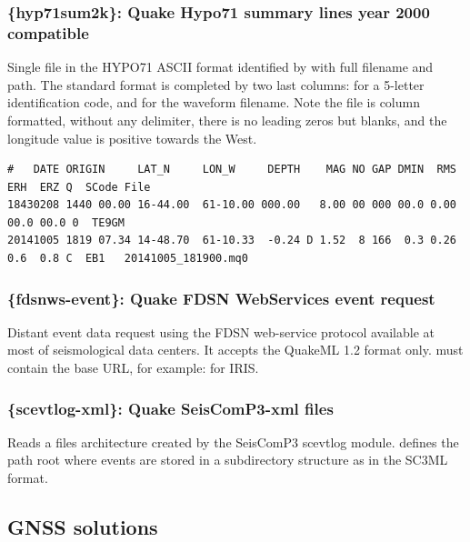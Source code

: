 \subsubsection{\{hyp71sum2k\}: Quake Hypo71 summary lines year 2000 compatible}

Single file in the HYPO71 ASCII format identified by  with full filename and path. The standard format is completed by two last columns:  for a 5-letter identification code, and  for the waveform filename. Note the file is column formatted, without any delimiter, there is no leading zeros but blanks, and the longitude value is positive towards the West.

\begin{lstlisting}[title=HYPO71 format example]
#   DATE ORIGIN     LAT_N     LON_W     DEPTH    MAG NO GAP DMIN  RMS  ERH  ERZ Q  SCode File
18430208 1440 00.00 16-44.00  61-10.00 000.00   8.00 00 000 00.0 0.00 00.0 00.0 0  TE9GM
20141005 1819 07.34 14-48.70  61-10.33  -0.24 D 1.52  8 166  0.3 0.26  0.6  0.8 C  EB1   20141005_181900.mq0
\end{lstlisting}


\subsubsection{\{fdsnws-event\}: Quake FDSN WebServices event request}

Distant event data request using the FDSN web-service protocol available at most of seismological data centers. It accepts the QuakeML 1.2 format only.  must contain the base URL, for example:  for IRIS.


\subsubsection{\{scevtlog-xml\}: Quake SeisComP3-xml files}

Reads a files architecture created by the SeisComP3 scevtlog module.  defines the path root where events are stored in a subdirectory structure as  in the SC3ML format.


\subsection{GNSS solutions}

